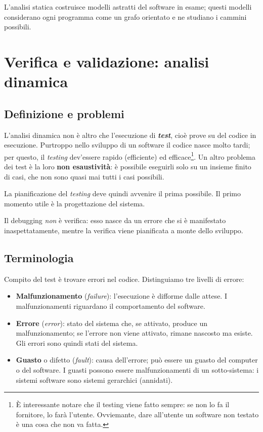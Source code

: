 \documentclass[a4paper]{article}
\begin{document}
		
L'analisi statica costruisce modelli astratti del software in esame; questi modelli considerano ogni programma come un grafo orientato e ne studiano i cammini possibili.
	


		
	\section{Verifica e validazione: analisi dinamica}


		
	\subsection{Definizione e problemi}

		
L'analisi dinamica non è altro che l'esecuzione di \textbf{\emph{test}}, cioè prove su del codice in esecuzione. Purtroppo nello sviluppo di un software il codice nasce molto tardi; per questo, il \emph{testing} dev'essere rapido (efficiente) ed efficace\footnote{È interessante notare che il testing viene fatto sempre: se non lo fa il fornitore, lo farà l'utente. Ovviemante, dare all'utente un software non testato è una cosa che non va fatta.}. Un altro problema dei test è la loro \textbf{non esaustività}: è possibile eseguirli solo su un insieme finito di casi, che non sono quasi mai tutti i casi possibili.
		
La pianificazione del \emph{testing} deve quindi avvenire il prima possibile. Il primo momento utile è la progettazione del sistema.
		
Il debugging \emph{non} è verifica: esso nasce da un errore che si è manifestato inaspettatamente, mentre la verifica viene pianificata a monte dello sviluppo.

		
	\subsection{Terminologia}

		
Compito del test è trovare errori nel codice. Distinguiamo tre livelli di errore:
		
	\begin{itemize}
		
			
	\item \textbf{Malfunzionamento} (\emph{failure}): l'esecuzione è difforme dalle attese. I malfunzionamenti riguardano il comportamento del software.
			
	\item \textbf{Errore} (\emph{error}): stato del sistema che, se attivato, produce un malfunzionamento; se l'errore non viene attivato, rimane nascosto ma esiste. Gli errori sono quindi stati del sistema.
			
	\item \textbf{Guasto} o difetto (\emph{fault}): causa dell'errore; può essere un guasto del computer o del software. I guasti possono essere malfunzionamenti di un sotto-sistema: i sistemi software sono sistemi gerarchici (annidati).
		
	\end{itemize}
\end{document}
